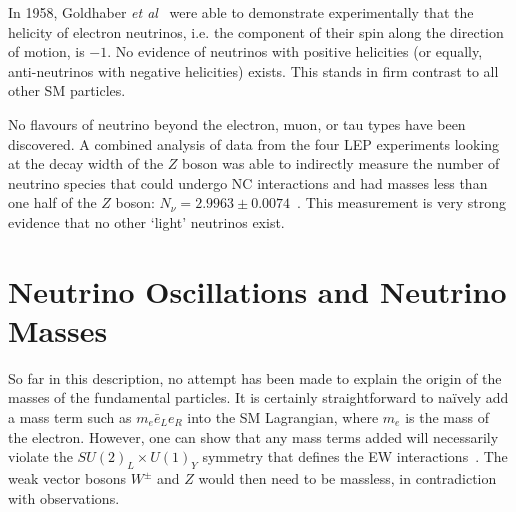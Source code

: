 In 1958, Goldhaber \textit{et al}~\cite{goldhaberHelicityNeutrinos1958} were able to demonstrate experimentally that the helicity of electron neutrinos, i.e. the component of their spin along the direction of motion, is $-1$. No evidence of neutrinos with positive helicities (or equally, anti-neutrinos with negative helicities) exists. This stands in firm contrast to all other SM particles.

No flavours of neutrino beyond the electron, muon, or tau types have been discovered. A combined analysis of data from the four LEP experiments looking at the decay width of the $Z$ boson was able to indirectly measure the number of neutrino species that could undergo NC interactions and had masses less than one half of the $Z$ boson: $N_{\nu} = 2.9963\pm0.0074$~\cite{}. %
This measurement is very strong evidence that no other `light' neutrinos exist.



\section{Neutrino Oscillations and Neutrino Masses}
So far in this description, no attempt has been made to explain the origin of the masses of the fundamental particles. It is certainly straightforward to na\"{i}vely add a mass term such as $m_{e}\bar{e}_{L}e_{R}$ into the SM Lagrangian, where $m_e$ is the mass of the electron. However, one can show that any mass terms added will necessarily violate the $SU(2)_{L}\times U(1)_{Y}$ symmetry that defines the EW interactions~\cite{}. %
The weak vector bosons $W^{\pm}$ and $Z$ would then need to be massless, in contradiction with observations.

